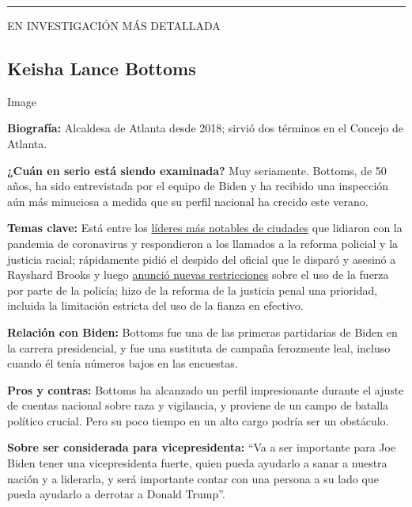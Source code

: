 \begin{center}\rule{0.5\linewidth}{\linethickness}\end{center}

EN INVESTIGACIÓN MÁS DETALLADA

\hypertarget{keisha-lance-bottoms}{%
\subsection{Keisha Lance Bottoms}\label{keisha-lance-bottoms}}

Image

\textbf{Biografía:} Alcaldesa de Atlanta desde 2018; sirvió dos términos
en el Concejo de Atlanta.

\textbf{¿Cuán en serio está siendo examinada?} Muy seriamente. Bottoms,
de 50 años, ha sido entrevistada por el equipo de Biden y ha recibido
una inspección aún más minuciosa a medida que su perfil nacional ha
crecido este verano.

\textbf{Temas clave:} Está entre los
\href{https://www.nytimes3xbfgragh.onion/2020/06/03/opinion/police-protests-atlanta-keisha-bottoms.html}{líderes
más notables de ciudades} que lidiaron con la pandemia de coronavirus y
respondieron a los llamados a la reforma policial y la justicia racial;
rápidamente pidió el despido del oficial que le disparó y asesinó a
Rayshard Brooks y luego
\href{https://www.nytimes3xbfgragh.onion/2020/06/15/us/rayshard-brooks-keisha-bottoms-atlanta.html}{anunció
nuevas restricciones} sobre el uso de la fuerza por parte de la policía;
hizo de la reforma de la justicia penal una prioridad, incluida la
limitación estricta del uso de la fianza en efectivo.

\textbf{Relación con Biden:} Bottoms fue una de las primeras partidarias
de Biden en la carrera presidencial, y fue una sustituta de campaña
ferozmente leal, incluso cuando él tenía números bajos en las encuestas.

\textbf{Pros y contras:} Bottoms ha alcanzado un perfil impresionante
durante el ajuste de cuentas nacional sobre raza y vigilancia, y
proviene de un campo de batalla político crucial. Pero su poco tiempo en
un alto cargo podría ser un obstáculo.

\textbf{Sobre ser considerada para vicepresidenta:} ``Va a ser
importante para Joe Biden tener una vicepresidenta fuerte, quien pueda
ayudarlo a sanar a nuestra nación y a liderarla, y será importante
contar con una persona a su lado que pueda ayudarlo a derrotar a Donald
Trump''.

